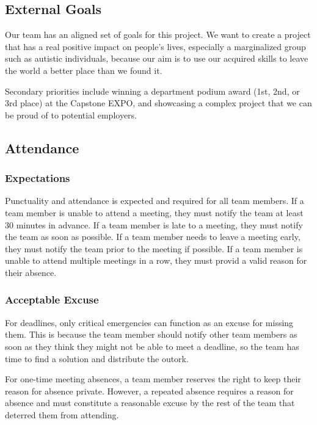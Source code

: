 \documentclass{article}
\begin{document}
\subsection*{External Goals}

Our team has an aligned set of goals for this project. We want to create a project that has a real positive impact on people's lives, especially a marginalized group such as autistic individuals, because our aim is to use our acquired skills to leave the world a better place than we found it. 

Secondary priorities include winning a department podium award (1st, 2nd, or 3rd place) at the Capstone EXPO, and showcasing a complex project that we can be proud of to potential employers.

\subsection*{Attendance}

\subsubsection*{Expectations}

\noindent Punctuality and attendance is expected and required for all team members. If a team member is unable to attend a meeting, they must notify the team at least 30 minutes in advance. If a team member is late to a meeting, they must notify the team as soon as possible. If a team member needs to leave a meeting early, they must notify the team prior to the meeting if possible. If a team member is unable to attend multiple meetings in a row, they must provid a valid reason for their absence.


\subsubsection*{Acceptable Excuse}

For deadlines, only critical emergencies can function as an excuse for missing them. This is because the team member should notify other team members as soon as they think they might not be able to meet a deadline, so the team has time to find a solution and distribute the outork.

For one-time meeting absences, a team member reserves the right to keep their reason for absence private. However, a repeated absence requires a reason for absence and must constitute a reasonable excuse by the rest of the team that deterred them from attending.
\end{document}
